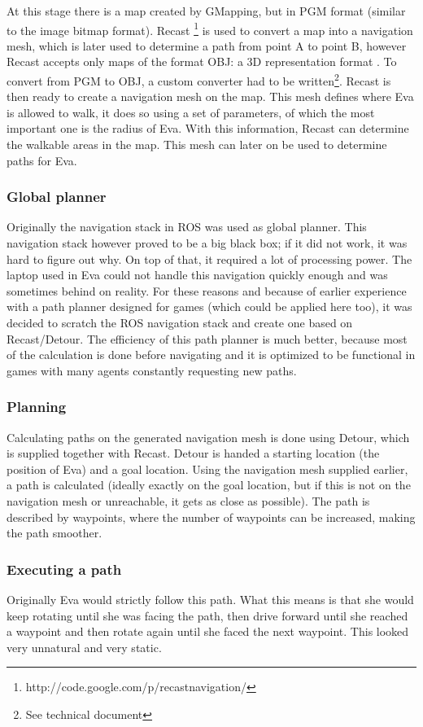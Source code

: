 \documentclass[project_eva.tex]{subfiles}
\begin{document}
At this stage there is a map created by GMapping, but in PGM format (similar to the image bitmap format). Recast 
\footnote{http://code.google.com/p/recastnavigation/} is used to convert a map into a navigation mesh, which is later used 
to determine a path from point A to point B, however Recast accepts only maps of the format OBJ: a 3D representation 
format \cite{wavefront}. To convert from PGM to OBJ, a custom converter had to be written\footnote{See technical document}. Recast is then ready to create a navigation mesh on the map. This mesh defines where 
Eva is allowed to walk, it does so using a set of parameters, of which the most important one is the radius of Eva. With 
this information, Recast can determine the walkable areas in the map. This mesh can later on be used to determine paths for Eva.

\subsubsection*{Global planner}
Originally the navigation stack in ROS was used as global planner. This navigation stack however proved to be a big black 
box; if it did not work, it was hard to figure out why. On top of that, it required a lot of processing power. The laptop 
used in Eva could not handle this navigation quickly enough and was sometimes behind on reality. For these reasons and 
because of earlier experience with a path planner designed for games (which could be applied here too), it was decided to 
scratch the ROS navigation stack and create one based on Recast/Detour. The efficiency of this path planner is much better, 
because most of the calculation is done before navigating and it is optimized to be functional in games with many agents constantly requesting new paths.

\subsubsection*{Planning}
Calculating paths on the generated navigation mesh is done using Detour, which is supplied together with Recast. Detour is 
handed a starting location (the position of Eva) and a goal location. Using the navigation mesh supplied earlier, a path is 
calculated (ideally exactly on the goal location, but if this is not on the navigation mesh or unreachable, it gets as 
close as possible). The path is described by waypoints, where the number of waypoints can be increased, making the path 
smoother.

\subsubsection*{Executing a path}
Originally Eva would strictly follow this path. What this means is that she would keep rotating until she was facing the 
path, then drive forward until she reached a waypoint and then rotate again until she faced the next waypoint. This looked 
very unnatural and very static. 
\end{document}
